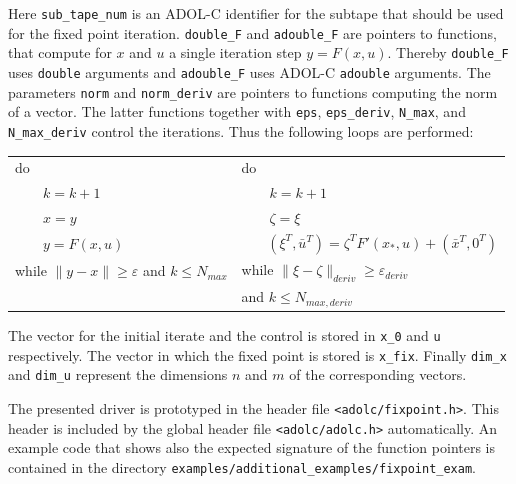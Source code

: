 \documentclass[11pt,twoside]{article}
\begin{document}
%
Here {\tt sub\_tape\_num} is an ADOL-C identifier for the subtape that
should be used for the fixed point iteration.
{\tt double\_F} and {\tt adouble\_F} are pointers to functions, that
compute for $x$ and $u$ a single iteration step $y=F(x,u)$. Thereby
{\tt double\_F} uses {\tt double} arguments and {\tt adouble\_F}
uses ADOL-C {\tt adouble} arguments. The parameters {\tt norm} and
{\tt norm\_deriv} are pointers to functions computing the norm
of a vector. The latter functions together with {\tt eps},
{\tt eps\_deriv}, {\tt N\_max}, and {\tt N\_max\_deriv} control
the iterations. Thus the following loops are performed:
\begin{center}
\begin{tabular}{ll}
  do                     &   do                           \\
  ~~~~$k = k+1$          &   ~~~~$k = k+1$                \\
  ~~~~$x = y$            &   ~~~~$\zeta = \xi$            \\
  ~~~~$y = F(x,u)$       &   ~~~
  $(\xi^T,\bar u^T) = \zeta^TF'(x_*,u) + (\bar x^T, 0^T)$ \\
  while $\|y-x\|\geq\varepsilon$ and $k\leq N_{max}$ \hspace*{0.5cm} &
  while $\|\xi -\zeta\|_{deriv}\geq\varepsilon_{deriv}$   \\
  & and $k\leq N_{max,deriv}$
\end{tabular}
\end{center}
The vector for the initial iterate and the control is stored
in {\tt x\_0} and {\tt u} respectively. The vector in which the
fixed point is stored is {\tt x\_fix}. Finally {\tt dim\_x}
and {\tt dim\_u} represent the dimensions $n$ and $m$ of the
corresponding vectors.

The presented driver is prototyped in the header file 
\verb=<adolc/fixpoint.h>=. This header
is included by the global header file \verb=<adolc/adolc.h>= automatically. 
An example code that shows also the
expected signature of the function pointers is contained in the directory \verb=examples/additional_examples/fixpoint_exam=.
%
\end{document}
